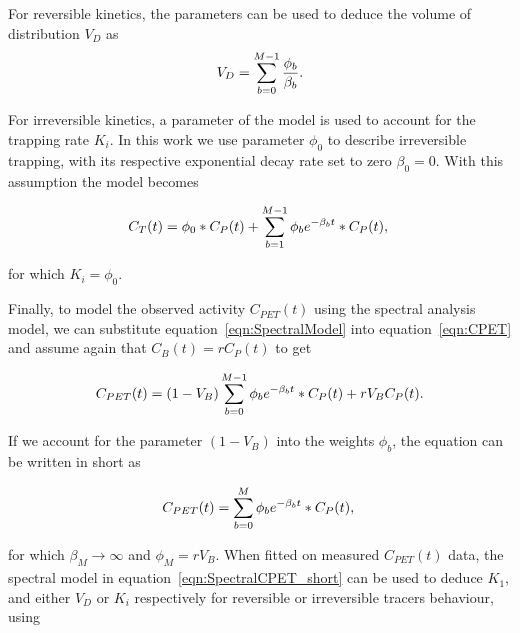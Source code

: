 For reversible kinetics, the parameters can be used to deduce the volume of distribution $V_D$ as
\begin{equation} 
\label{eqn:SpectralModel_VD}
V_D  =  \sum_{b=0}^{M-1} \frac{\phi_b}{\beta_b}   \\ . \\
\end{equation}

For irreversible kinetics, a parameter of the model is used to account for the trapping rate $K_i$. In this work we use parameter ${\phi_0}$ to describe irreversible trapping, with its respective exponential decay rate set to zero ${\beta_0} = 0 $. With this assumption the model becomes

\begin{equation} 
\label{eqn:SpectralModel_Complete}
C_{T}(t)  = \phi_0 \ast C_P(t) + \sum_{b=1}^{M-1} {\phi_b}  e^{-\beta_b t} \ast C_P(t)  \\ , \\
\end{equation}

for which $K_i = {\phi_0}$. 

Finally, to model the observed activity $C_{PET}(t)$ using the spectral analysis model, we can substitute equation~\ref{eqn:SpectralModel} into equation~\ref{eqn:CPET} and assume again that $C_{B}(t) = r C_{P}(t)$ to get

\begin{equation} 
{C_{PET}}(t)  = (1-V_{B}) \sum_{b=0}^{M-1} {\phi_b}  e^{-\beta_b t} \ast C_P(t) + r V_{B}  C_P(t)   \\ . \\
\label{eqn:SpectralCPET}
\end{equation}

If we account for the parameter $(1-V_{B})$ into the weights $\phi_b$, the equation can be written in short as 

\begin{equation} 
{C_{PET}}(t)  = \sum_{b=0}^{M} {\phi_b} e^{-\beta_b t} \ast C_P(t)   \\ , \\
\label{eqn:SpectralCPET_short}
\end{equation}

for which $\beta_M \xrightarrow[]{}\infty$ and $\phi_M = r V_{B}$. 
When fitted on measured ${C_{PET}}(t)$ data, the spectral model in equation~\ref{eqn:SpectralCPET_short} can be used to deduce $K_1$, and either $V_D$ or $K_i$ respectively for reversible or irreversible tracers behaviour, using

